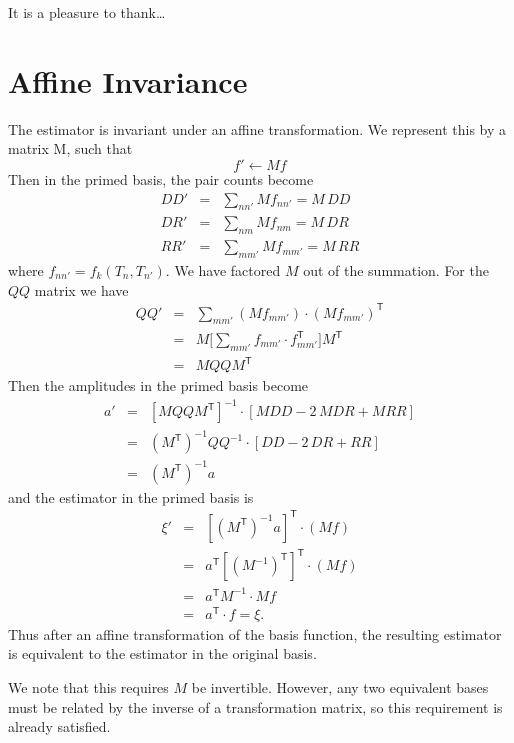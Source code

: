 \documentclass[modern]{aastex62}
\newcommand{\inv}{^{-1}}
\newcommand{\T}{^{\mathsf{T}}}
\begin{document}
\acknowledgements
It is a pleasure to thank\ldots

\appendix
\section{Affine Invariance}\label{sec:affine}

The estimator is invariant under an affine transformation. We represent this by a matrix M, such that 
\begin{equation}
f' \leftarrow Mf
\end{equation}
Then in the primed basis, the pair counts become
\begin{eqnarray}\displaystyle
DD' &=& \sum_{n n'} M f_{n n'} = M\,DD
\\
DR' &=& \sum_{n m} M f_{n m} = M\,DR
\\
RR' &=& \sum_{m m'} M f_{m m'} = M\,RR
\end{eqnarray}
where $f_{n n'} = f_k(T_n, T_{n'})$.
We have factored $M$ out of the summation. For the $QQ$ matrix we have
\begin{eqnarray}\displaystyle
QQ' &=& \sum_{m m'} (Mf_{m m'}) \cdot (Mf_{m m'})\T \\
&=& M\Bigg[ \sum_{m m'} f_{m m'} \cdot f_{m m'}\T \Bigg]M\T \\
&=& M QQ M\T
\end{eqnarray}
Then the amplitudes in the primed basis become
\begin{eqnarray}\displaystyle
a' &=& [M QQ M\T]\inv \cdot [MDD - 2\,MDR + MRR] \\
&=& (M\T)\inv QQ\inv \cdot [DD - 2\,DR + RR] \\
&=& (M\T)\inv a
\end{eqnarray}
and the estimator in the primed basis is 
\begin{eqnarray}\displaystyle
\xi' &=& [(M\T)\inv a]\T \cdot (Mf) \\
&=& a\T[(M\inv)\T]\T \cdot (Mf) \\
&=& a\T M\inv \cdot Mf \\
&=& a\T \cdot f = \xi.
\end{eqnarray}
Thus after an affine transformation of the basis function, the resulting estimator is equivalent to the estimator in the original basis.

We note that this requires $M$ be invertible.
However, any two equivalent bases must be related by the inverse of a transformation matrix, so this requirement is already satisfied.
\end{document}
